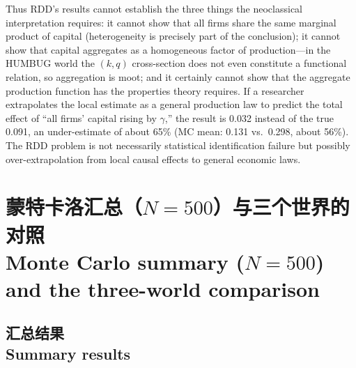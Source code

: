 \documentclass[12pt,a4paper]{ctexart}
\begin{document}
Thus RDD's results cannot establish the three things the neoclassical interpretation requires: it cannot show that all firms share the same marginal product of capital (heterogeneity is precisely part of the conclusion); it cannot show that capital aggregates as a homogeneous factor of production—in the HUMBUG world the $(k,q)$ cross-section does not even constitute a functional relation, so aggregation is moot; and it certainly cannot show that the aggregate production function has the properties theory requires. If a researcher extrapolates the local estimate as a general production law to predict the total effect of “all firms' capital rising by $\gamma$,” the result is 0.032 instead of the true 0.091, an under-estimate of about 65\% (MC mean: 0.131 vs.\ 0.298, about 56\%). The RDD problem is not necessarily statistical identification failure but possibly over-extrapolation from local causal effects to general economic laws.

\section[蒙特卡洛汇总]{蒙特卡洛汇总（$N = 500$）与三个世界的对照\\[2pt]\normalsize Monte Carlo summary ($N=500$) and the three-world comparison}\label{sec:mc}

\subsection[汇总结果]{汇总结果\\[1pt]\normalsize Summary results}
\end{document}
